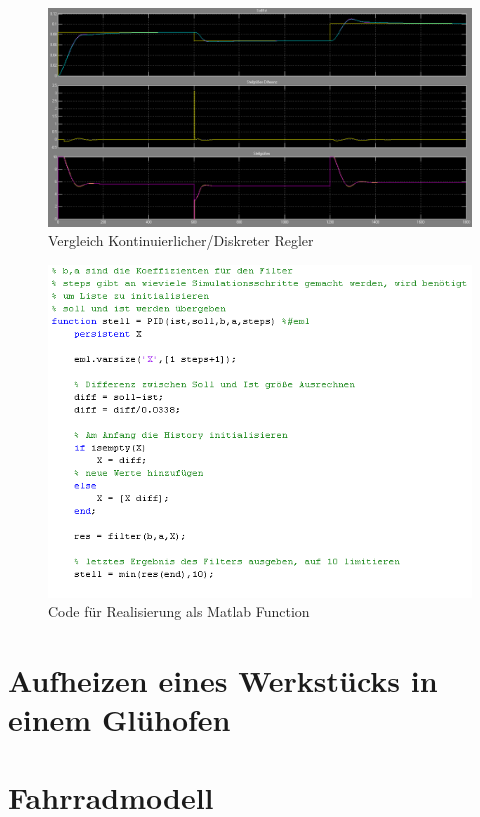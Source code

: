 \documentclass[a4paper]{article}
\begin{document}
\begin{figure}[ht!]
    \centering
    \includegraphics[width=\linewidth]{erg_bsp1.png}
    \caption{Vergleich Kontinuierlicher/Diskreter Regler}
    \label{fig:bsp1}
\end{figure}

\begin{figure}[ht!]
    \centering
    \includegraphics[width=\linewidth]{code_bsp1.png}
    \caption{Code für Realisierung als Matlab Function}
    \label{fig:bsp1_code}
\end{figure}

\section{Aufheizen eines Werkstücks in einem Glühofen}

\section{Fahrradmodell}
\end{document}
